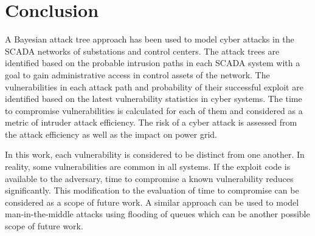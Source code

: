 \section{Conclusion}\label{sec:conclude}
A Bayesian attack tree approach has been used to model cyber attacks in the SCADA networks of substations and control centers. The attack trees are identified based on the probable intrusion paths in each SCADA system with a goal to gain administrative access in control assets of the network. The vulnerabilities in each attack path and probability of their successful exploit are identified based on the latest vulnerability statistics in cyber systems. The time to compromise vulnerabilities is calculated for each of them and considered as a metric of intruder attack efficiency. The risk of a cyber attack is assessed from the attack efficiency as well as the impact on power grid.

In this work, each vulnerability is considered to be distinct from one another. In reality, some vulnerabilities are common in all systems. If the exploit code is available to the adversary, time to compromise a known vulnerability reduces significantly. This modification to the evaluation of time to compromise can be considered as a scope of future work. A similar approach can be used to model man-in-the-middle attacks using flooding of queues which can be another possible scope of future work. 